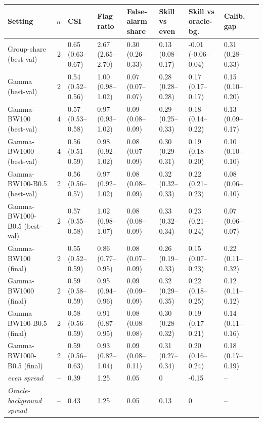 \begin{tabular}{lrlllllll}
\toprule
Setting & $n$ & CSI & Flag ratio & False-alarm share & Skill vs even & Skill vs oracle-bg. & Calib. gap \\
\midrule
Group-share (best-val) & 2 & 0.65 (0.63--0.67) & 2.67 (2.65--2.70) & 0.30 (0.26--0.33) & 0.13 (0.08--0.17) & -0.01 (-0.06--0.04) & 0.31 (0.28--0.33) \\
Gamma (best-val) & 2 & 0.54 (0.52--0.56) & 1.00 (0.98--1.02) & 0.07 (0.07--0.07) & 0.28 (0.28--0.28) & 0.17 (0.17--0.17) & 0.15 (0.10--0.20) \\
Gamma-BW100 (best-val) & 4 & 0.57 (0.53--0.58) & 0.97 (0.93--1.02) & 0.09 (0.08--0.09) & 0.29 (0.25--0.33) & 0.18 (0.14--0.22) & 0.13 (0.09--0.17) \\
Gamma-BW1000 (best-val) & 4 & 0.56 (0.51--0.59) & 0.98 (0.92--1.02) & 0.08 (0.07--0.09) & 0.30 (0.29--0.31) & 0.19 (0.18--0.20) & 0.10 (0.10--0.10) \\
Gamma-BW100-B0.5 (best-val) & 2 & 0.56 (0.56--0.57) & 0.97 (0.92--1.02) & 0.08 (0.08--0.09) & 0.32 (0.32--0.33) & 0.22 (0.21--0.23) & 0.08 (0.06--0.10) \\
Gamma-BW1000-B0.5 (best-val) & 2 & 0.57 (0.55--0.58) & 1.02 (0.98--1.07) & 0.08 (0.08--0.09) & 0.33 (0.32--0.34) & 0.23 (0.21--0.24) & 0.07 (0.06--0.07) \\
Gamma-BW100 (final) & 2 & 0.55 (0.52--0.59) & 0.86 (0.77--0.95) & 0.08 (0.07--0.09) & 0.26 (0.19--0.33) & 0.15 (0.07--0.23) & 0.22 (0.11--0.32) \\
Gamma-BW1000 (final) & 2 & 0.59 (0.58--0.59) & 0.95 (0.94--0.96) & 0.09 (0.09--0.09) & 0.32 (0.29--0.35) & 0.22 (0.18--0.25) & 0.12 (0.11--0.12) \\
Gamma-BW100-B0.5 (final) & 2 & 0.58 (0.56--0.59) & 0.91 (0.87--0.95) & 0.08 (0.08--0.08) & 0.30 (0.28--0.32) & 0.19 (0.17--0.21) & 0.14 (0.11--0.16) \\
Gamma-BW1000-B0.5 (final) & 2 & 0.59 (0.56--0.63) & 0.93 (0.82--1.04) & 0.09 (0.08--0.11) & 0.31 (0.27--0.34) & 0.20 (0.16--0.24) & 0.18 (0.17--0.19) \\
\midrule
\emph{even spread} & -- & 0.39 & 1.25 & 0.05 & 0 & -0.15 & -- \\
\emph{Oracle-background spread} & -- & 0.43 & 1.25 & 0.05 & 0.13 & 0 & -- \\
\bottomrule
\end{tabular}
